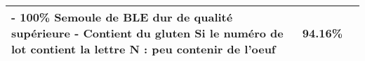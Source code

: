 \begin{longtable}{p{9cm}p{9cm}c}
                                                                                                                                                                                                                                                                                                                                                                                                                                                                                                                                                                                                                                                                                                                                                                                                                                                                                                                                              - 100\% Semoule de BLE dur de qualité supérieure \newline - Contient du gluten \newline Si le numéro de lot contient la lettre N : peu contenir de l'oeuf &   94.16\% \\ \hline

\end{longtable}
